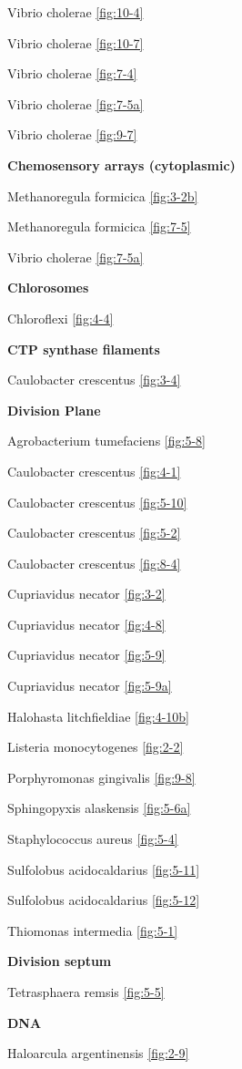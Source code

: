 \documentclass[]{tufte-book}
\begin{document}
Vibrio cholerae \ref{fig:10-4}

Vibrio cholerae \ref{fig:10-7}

Vibrio cholerae \ref{fig:7-4}

Vibrio cholerae \ref{fig:7-5a}

Vibrio cholerae \ref{fig:9-7}

\textbf{Chemosensory arrays (cytoplasmic)}

Methanoregula formicica \ref{fig:3-2b}

Methanoregula formicica \ref{fig:7-5}

Vibrio cholerae \ref{fig:7-5a}

\textbf{Chlorosomes}

Chloroflexi \ref{fig:4-4}

\textbf{CTP synthase filaments}

Caulobacter crescentus \ref{fig:3-4}

\textbf{Division Plane}

Agrobacterium tumefaciens \ref{fig:5-8}

Caulobacter crescentus \ref{fig:4-1}

Caulobacter crescentus \ref{fig:5-10}

Caulobacter crescentus \ref{fig:5-2}

Caulobacter crescentus \ref{fig:8-4}

Cupriavidus necator \ref{fig:3-2}

Cupriavidus necator \ref{fig:4-8}

Cupriavidus necator \ref{fig:5-9}

Cupriavidus necator \ref{fig:5-9a}

Halohasta litchfieldiae \ref{fig:4-10b}

Listeria monocytogenes \ref{fig:2-2}

Porphyromonas gingivalis \ref{fig:9-8}

Sphingopyxis alaskensis \ref{fig:5-6a}

Staphylococcus aureus \ref{fig:5-4}

Sulfolobus acidocaldarius \ref{fig:5-11}

Sulfolobus acidocaldarius \ref{fig:5-12}

Thiomonas intermedia \ref{fig:5-1}

\textbf{Division septum}

Tetrasphaera remsis \ref{fig:5-5}

\textbf{DNA}

Haloarcula argentinensis \ref{fig:2-9}
\end{document}
